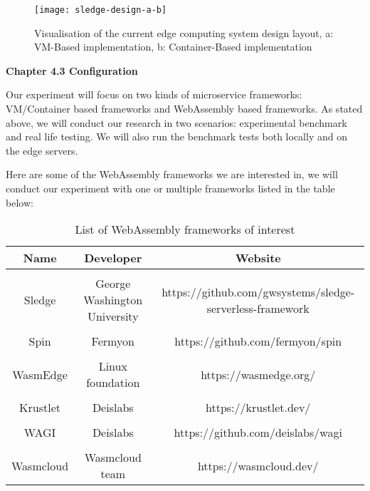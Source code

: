 \bigskip

\begin{figure}[hp]
\centering
\texttt{[image: sledge-design-a-b]}
\caption{\footnotesize{Visualisation of the current edge computing system design layout, a: VM-Based implementation, b: Container-Based implementation }}
\captionsetup{aboveskip=0pt,font=it}
\label{fig:javascript_meme}
\end{figure}

\bigskip
\bigskip

\textbf{{\Large Chapter 4.3 Configuration}}

\bigskip

Our experiment will focus on two kinds of microservice frameworks: VM/Container based frameworks and WebAssembly based frameworks. As stated above, we will conduct our research in two scenarios: experimental benchmark and real life testing. We will also run the benchmark tests both locally and on the edge servers.

Here are some of the WebAssembly frameworks we are interested in, we will conduct our experiment with one or multiple frameworks listed in the table below:

\bigskip

\begin{table}[h!]
\centering
\begin{tabular}{||c c c||} 
\hline
Name & Developer & Website \\ [0.5ex] 
\hline\hline
 & & \\
Sledge & George Washington University & https://github.com/gwsystems/sledge-serverless-framework \\ 
 & & \\
Spin & Fermyon & https://github.com/fermyon/spin \\
 & & \\
WasmEdge & Linux foundation & https://wasmedge.org/ \\
 & & \\
Krustlet & Deislabs & https://krustlet.dev/ \\
 & & \\
WAGI & Deislabs & https://github.com/deislabs/wagi \\
 & & \\
Wasmcloud & Wasmcloud team & https://wasmcloud.dev/ \\ [1ex] 
\hline
\end{tabular}
\caption{List of WebAssembly frameworks of interest}
\label{table:1}
\end{table}

